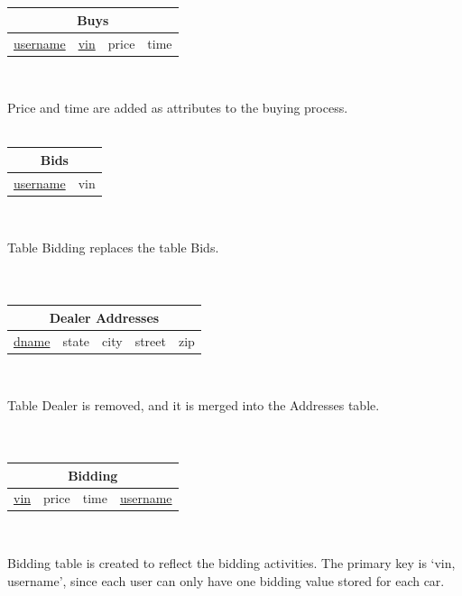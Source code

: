 \documentclass[12pt]{article}
\begin{document}
~\\~\\
\begin{tabularx}{\textwidth}{|X|X|X|X|}
\hline
\multicolumn{4}{|c|}{Buys}\\\hline
\underline{username} & \underline{vin} & \cellcolor{green!25}price & \cellcolor{green!25}time\\\hline
\end{tabularx}
~\\
\par Price and time are added as attributes to the buying process.\\
~\\
\begin{tabularx}{\textwidth}{|X|X|}
\hline
\multicolumn{2}{|c|}{\cellcolor{red!25}Bids}\\\hline
\cellcolor{red!25}\underline{username} & \cellcolor{red!25}vin\\\hline
\end{tabularx}
~\\
\par Table Bidding replaces the table Bids.\\
~\\~\\
\begin{tabularx}{\textwidth}{|X|X|X|X|X|}
\hline
\multicolumn{5}{|c|}{\cellcolor{red!25}Dealer Addresses}\\\hline
\cellcolor{red!25}\underline{dname} & \cellcolor{red!25}state & \cellcolor{red!25}city & \cellcolor{red!25}street & \cellcolor{red!25}zip\\\hline
\end{tabularx}
~\\
\par Table Dealer is removed, and it is merged into the Addresses table.\\
~\\~\\
\begin{tabularx}{\textwidth}{|X|X|X|X|}
\hline
\multicolumn{4}{|c|}{\cellcolor{green!25}Bidding}\\\hline
\cellcolor{green!25}\underline{vin} & \cellcolor{green!25}price & \cellcolor{green!25}time & \cellcolor{green!25}\underline{username}\\\hline
\end{tabularx}
~\\
\par Bidding table is created to reflect the bidding activities. The primary key is `vin, username', since each user can only have one bidding value stored for each car.\\
\end{document}
